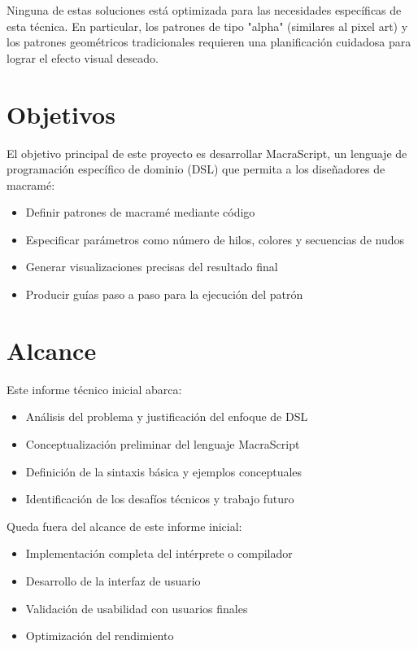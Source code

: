 \documentclass[12pt,a4paper]{report}
\begin{document}
Ninguna de estas soluciones está optimizada para las necesidades específicas de esta técnica. En particular, los patrones de tipo "alpha" (similares al pixel art) y los patrones geométricos tradicionales requieren una planificación cuidadosa para lograr el efecto visual deseado.

\section{Objetivos}
El objetivo principal de este proyecto es desarrollar MacraScript, un lenguaje de programación específico de dominio (DSL) que permita a los diseñadores de macramé:

\begin{itemize}
    \item Definir patrones de macramé mediante código
    \item Especificar parámetros como número de hilos, colores y secuencias de nudos
    \item Generar visualizaciones precisas del resultado final
    \item Producir guías paso a paso para la ejecución del patrón
\end{itemize}

\section{Alcance}
Este informe técnico inicial abarca:

\begin{itemize}
    \item Análisis del problema y justificación del enfoque de DSL
    \item Conceptualización preliminar del lenguaje MacraScript
    \item Definición de la sintaxis básica y ejemplos conceptuales
    \item Identificación de los desafíos técnicos y trabajo futuro
\end{itemize}

Queda fuera del alcance de este informe inicial:

\begin{itemize}
    \item Implementación completa del intérprete o compilador
    \item Desarrollo de la interfaz de usuario
    \item Validación de usabilidad con usuarios finales
    \item Optimización del rendimiento
\end{itemize}
\end{document}

